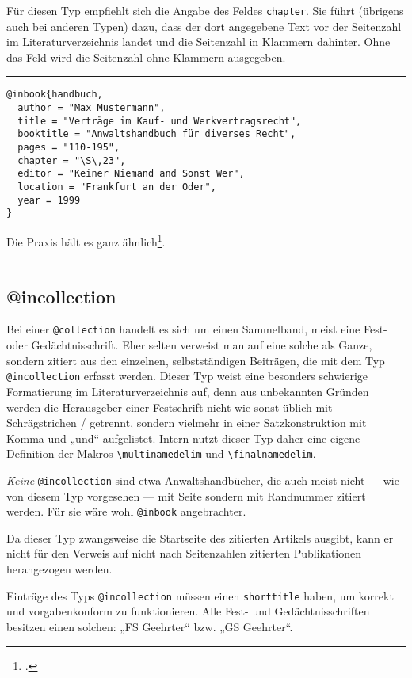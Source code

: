 \documentclass[11pt,a4paper,DIV=calc]{scrartcl}
\newenvironment{rubexample}{\par\vspace{\baselineskip}\hrule\par\begin{refsection}}{\end{refsection}\par\hrule\par\vspace{\baselineskip}}
\begin{document}
Für diesen Typ empfiehlt sich die Angabe des Feldes
\verb+chapter+. Sie führt (übrigens auch bei anderen Typen) dazu, dass
der dort angegebene Text vor der Seitenzahl im Literaturverzeichnis
landet und die Seitenzahl in Klammern dahinter. Ohne das Feld wird die
Seitenzahl ohne Klammern ausgegeben.

\begin{rubexample}
\begin{verbatim}
@inbook{handbuch,
  author = "Max Mustermann",
  title = "Verträge im Kauf- und Werkvertragsrecht",
  booktitle = "Anwaltshandbuch für diverses Recht",
  pages = "110-195",
  chapter = "\S\,23",
  editor = "Keiner Niemand and Sonst Wer",
  location = "Frankfurt an der Oder",
  year = 1999
}
\end{verbatim}

Die Praxis hält es ganz ähnlich\footcite[\S\,23 Rnr.\,55]{handbuch}.

\printbibliography
\end{rubexample}

\subsection{@incollection}\label{sec:incollection}

Bei einer \verb+@collection+ handelt es sich um einen Sammelband,
meist eine Fest- oder Gedächtnisschrift. Eher selten verweist man auf
eine solche als Ganze, sondern zitiert aus den einzelnen,
selbstständigen Beiträgen, die mit dem Typ \verb+@incollection+
erfasst werden. Dieser Typ weist eine besonders schwierige
Formatierung im Literaturverzeichnis auf, denn aus unbekannten Gründen
werden die Herausgeber einer Festschrift nicht wie sonst üblich mit
Schrägstrichen / getrennt, sondern vielmehr in einer Satzkonstruktion
mit Komma und „und“ aufgelistet. Intern nutzt dieser Typ daher eine
eigene Definition der Makros \verb+\multinamedelim+ und
\verb+\finalnamedelim+.

\emph{Keine} \verb+@incollection+ sind etwa Anwaltshandbücher, die
auch meist nicht — wie von diesem Typ vorgesehen — mit Seite sondern
mit Randnummer zitiert werden. Für sie wäre wohl \verb+@inbook+
angebrachter.

Da dieser Typ zwangsweise die Startseite des zitierten Artikels
ausgibt, kann er nicht für den Verweis auf nicht nach Seitenzahlen
zitierten Publikationen herangezogen werden.

Einträge des Typs \verb+@incollection+ müssen einen \verb+shorttitle+
haben, um korrekt und vorgabenkonform zu funktionieren. Alle Fest- und
Gedächtnisschriften besitzen einen solchen: „FS Geehrter“ bzw. „GS
Geehrter“.
\end{document}
